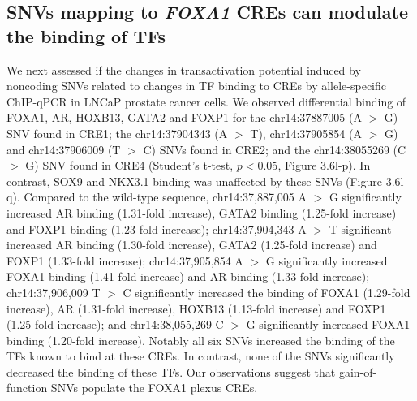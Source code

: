 \subsection{SNVs mapping to \emph{FOXA1} CREs can modulate the binding of TFs}

We next assessed if the changes in transactivation potential induced by noncoding SNVs related to changes in TF binding to CREs by allele-specific ChIP-qPCR \cite{baileyNoncodingSomaticInherited2016,zhangIntegrativeFunctionalGenomics2012,cowper-sal*lariBreastCancerRisk2012} in LNCaP prostate cancer cells.
We observed differential binding of FOXA1, AR, HOXB13, GATA2 and FOXP1 for the chr14:37887005 (A $>$ G) SNV found in CRE1; the chr14:37904343 (A $>$ T), chr14:37905854 (A $>$ G) and chr14:37906009 (T $>$ C) SNVs found in CRE2; and the chr14:38055269 (C $>$ G) SNV found in CRE4 (Student’s t-test, $p<0.05$, Figure 3.6l-p).
In contrast, SOX9 and NKX3.1 binding was unaffected by these SNVs (Figure  3.6l-q).
Compared to the wild-type sequence, chr14:37,887,005 A $>$ G significantly increased AR binding (1.31-fold increase), GATA2 binding (1.25-fold increase) and FOXP1 binding (1.23-fold increase); chr14:37,904,343 A $>$ T significant increased AR binding (1.30-fold increase), GATA2 (1.25-fold increase) and FOXP1 (1.33-fold increase); chr14:37,905,854 A $>$ G significantly increased FOXA1 binding (1.41-fold increase) and AR binding (1.33-fold increase); chr14:37,906,009 T $>$ C significantly increased the binding of FOXA1 (1.29-fold increase), AR (1.31-fold increase), HOXB13 (1.13-fold increase) and FOXP1 (1.25-fold increase); and chr14:38,055,269 C $>$ G significantly increased FOXA1 binding (1.20-fold increase).
Notably all six SNVs increased the binding of the TFs known to bind at these CREs.
In contrast, none of the SNVs significantly decreased the binding of these TFs.
Our observations suggest that gain-of-function SNVs populate the FOXA1 plexus CREs.
